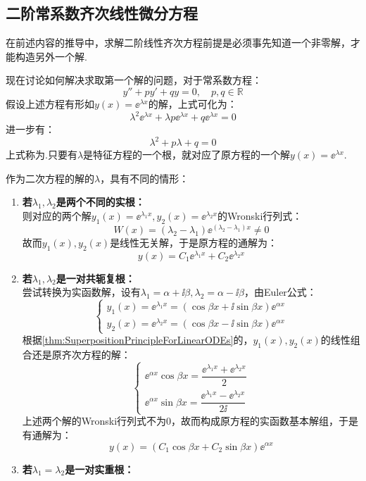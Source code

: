 \subsection{二阶常系数齐次线性微分方程}
在前述内容的推导中，求解二阶线性齐次方程前提是必须事先知道一个非零解，才能构造另外一个解.

现在讨论如何解决求取第一个解的问题，对于常系数方程：
\[y'' + py' + qy = 0,\quad p,q\in\mathbb{R}\]
假设上述方程有形如$y(x) = \ee^{\lambda x}$的解，上式可化为：
\[\lambda^2 \ee^{\lambda x} + \lambda p \ee^{\lambda x} + q \ee^{\lambda x} = 0\]
进一步有：
\[\lambda^2 + p\lambda + q =0\]
上式称为.只要有$\lambda$是特征方程的一个根，就对应了原方程的一个解$y(x)=\ee^{\lambda x}$.

作为二次方程的解的$\lambda$，具有不同的情形：
\begin{enumerate}[circ]
    \item \textbf{若$\lambda_1,\lambda_2$是两个不同的实根：}\\
    则对应的两个解$y_1(x)=\ee^{\lambda_1 x},y_2(x)=\ee^{\lambda_2 x}$的Wronski行列式：
    \[W(x) = (\lambda_2 - \lambda_1)\ee^{(\lambda_2 - \lambda_1)x} \neq 0\]
    故而$y_1(x),y_2(x)$是线性无关解，于是原方程的通解为：
    \[y(x) = C_1\ee^{\lambda_1 x} + C_2\ee^{\lambda_2 x}\]
    \item \textbf{若$\lambda_1,\lambda_2$是一对共轭复根：}\\
    尝试转换为实函数解，设有$\lambda_1 = \alpha + \ii\beta,\lambda_2 = \alpha - \ii\beta$，由Euler公式：
    \[\begin{cases}
        y_1(x) = \ee^{\lambda_1 x} = (\cos\beta x + \ii\sin\beta x)\ee^{\alpha x} \\
        y_2(x) = \ee^{\lambda_2 x} = (\cos\beta x - \ii\sin\beta x)\ee^{\alpha x}
    \end{cases}\]
    根据\cref{thm:SuperpositionPrincipleForLinearODEs}的，$y_1(x),y_2(x)$的线性组合还是原齐次方程的解：
    \[\begin{cases}
        \ee^{\alpha x}\cos\beta x = \dfrac{\ee^{\lambda_1 x} + \ee^{\lambda_2 x}}{2} \\
        \ee^{\alpha x}\sin\beta x = \dfrac{\ee^{\lambda_1 x} - \ee^{\lambda_2 x}}{2\ii}
    \end{cases}\]
    上述两个解的Wronski行列式不为$0$，故而构成原方程的实函数基本解组，于是有通解为：
    \[y(x) = (C_1 \cos\beta x + C_2 \sin\beta x)\ee^{\alpha x}\]
    \item \textbf{若$\lambda_1 = \lambda_2$是一对实重根：}\\

\end{enumerate}
